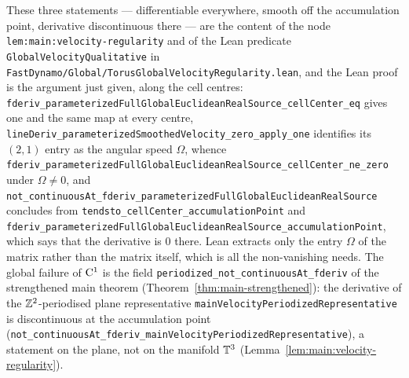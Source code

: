 These three statements --- differentiable everywhere, smooth off the accumulation point,
derivative discontinuous there --- are the content of the node
\texttt{lem:main:velocity-regularity} and of the Lean predicate
\texttt{GlobalVelocityQualitative} in
\texttt{FastDynamo/Global/TorusGlobalVelocityRegularity.lean}, and the Lean proof is the
argument just given, along the cell centres:
\texttt{fderiv\_\allowbreak parameterizedFullGlobalEuclideanRealSource\_\allowbreak cellCenter\_\allowbreak eq} gives one
and the same map at every centre,
\texttt{lineDeriv\_parameterizedSmoothedVelocity\_zero\_apply\_one} identifies its $(2,1) $
entry as the angular speed $\Omega $, whence
\texttt{fderiv\_\allowbreak parameterizedFullGlobalEuclideanRealSource\_\allowbreak cellCenter\_\allowbreak ne\_\allowbreak zero} under
$\Omega\neq0 $, and
\texttt{not\_\allowbreak continuousAt\_\allowbreak fderiv\_\allowbreak parameterizedFullGlobalEuclideanRealSource} concludes from
\texttt{tendsto\_cellCenter\_accumulationPoint} and
\texttt{fderiv\_\allowbreak parameterizedFullGlobalEuclideanRealSource\_\allowbreak accumulationPoint}, which says that
the derivative is $0 $ there.  Lean extracts only the entry $\Omega $ of the
matrix rather than the matrix itself, which is all the non-vanishing needs.  The global
failure of $\mathrm{C}^1 $ is the field \texttt{periodized\_not\_continuousAt\_fderiv} of the
strengthened main theorem (Theorem~\ref{thm:main-strengthened}): the derivative of the
$\mathbb{Z}^2$-periodised plane representative \texttt{mainVelocityPeriodizedRepresentative} is
discontinuous at the accumulation point
(\texttt{not\_\allowbreak continuousAt\_\allowbreak fderiv\_\allowbreak mainVelocityPeriodizedRepresentative}), a statement on
the plane, not on the manifold $\mathbb{T}^3 $ (Lemma~\ref{lem:main:velocity-regularity}).
